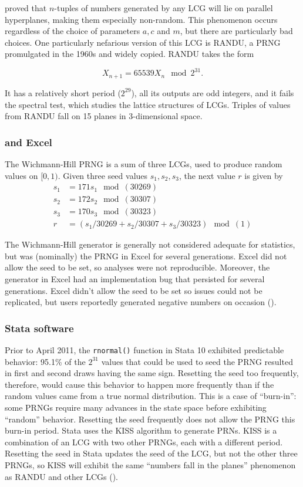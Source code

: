 \documentclass[12pt]{article}
\newcommand{\todo}[1]{{\color{red}{TO DO: \sc #1}}}
\begin{document}
\citet{marsaglia_random_1968} proved that $n$-tuples of numbers generated by any LCG will lie on parallel hyperplanes, making them especially non-random.
This phenomenon occurs regardless of the choice of parameters $a, c$ and $m$, but there are particularly bad choices.
One particularly nefarious version of this LCG is RANDU, a PRNG promulgated in the 1960s and widely copied. 
RANDU takes the form

$$X_{n+1} = 65539 X_n \mod 2^{31}.$$

It has a relatively short period ($2^{29}$), all its outputs are odd integers, and it fails the spectral test, which studies the lattice structures of LCGs.
Triples of values from RANDU fall on 15 planes in 3-dimensional space.
\todo{mention RANDU blowing up science, finding erroneous crystallographic structure}


\subsubsection{\citet{wichmann_algorithm_1982} and Excel}
The Wichmann-Hill PRNG is a sum of three LCGs, used to produce random values on $[0, 1)$.
Given three seed values $s_1, s_2, s_3$, the next value $r$ is given by
\begin{align*}
s_1 &= 171 s_1\mod(30269) \\
s_2 &= 172 s_2 \mod(30307) \\
s_3 &= 170 s_3 \mod(30323) \\
r &= (s_1/30269 + s_2/30307 + s_3/30323) \mod(1)
\end{align*}

The Wichmann-Hill generator is generally not considered adequate for statistics, but was (nominally) the PRNG in Excel for several generations. 
Excel did not allow the seed to be set, so analyses were not reproducible.
Moreover, the generator in Excel had an implementation bug that persisted for several generations.
Excel didn't allow the seed to be set so issues could not be replicated, but users reportedly generated negative numbers on occasion (\cite{mccullough_microsoft_2008}).

\subsubsection{Stata software}
Prior to April 2011, the \texttt{rnormal()} function in Stata 10 exhibited predictable behavior:
95.1\% of the $2^{31}$ values that could be used to seed the PRNG resulted in first and second draws having the same sign.
Resetting the seed too frequently, therefore, would cause this behavior to happen more frequently than if the 
random values came from a true normal distribution.
This is a case of ``burn-in'': some PRNGs require many advances in the state space before exhibiting ``random'' behavior.
Resetting the seed frequently does not allow the PRNG this burn-in period.
Stata uses the KISS algorithm to generate PRNs.
KISS is a combination of an LCG with two other PRNGs, each with a different period.
 \todo{describe KISS and cite Marsaglia}
Resetting the seed in Stata updates the seed of the LCG, but not the other three PRNGs, so KISS will exhibit the same
``numbers fall in the planes'' phenomenon as RANDU and other LCGs (\cite{ozier_perils_2012}).
\end{document}
